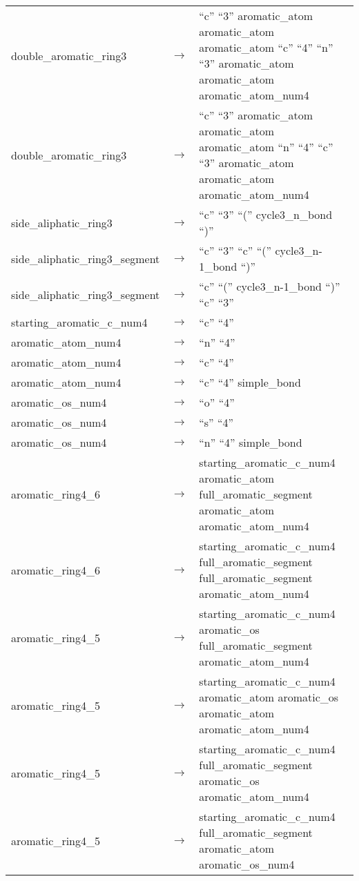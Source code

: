 \begin{longtable}{m{} p{} p{}}
    double\_aromatic\_ring3 & $\rightarrow$ & ``c'' ``3'' aromatic\_atom aromatic\_atom aromatic\_atom ``c'' ``4'' ``n'' ``3'' aromatic\_atom aromatic\_atom aromatic\_atom\_num4 \\
    double\_aromatic\_ring3 & $\rightarrow$ & ``c'' ``3'' aromatic\_atom aromatic\_atom aromatic\_atom ``n'' ``4'' ``c'' ``3'' aromatic\_atom aromatic\_atom aromatic\_atom\_num4 \\
    side\_aliphatic\_ring3 & $\rightarrow$ & ``c'' ``3'' ``('' cycle3\_n\_bond ``)'' \\
    side\_aliphatic\_ring3\_segment & $\rightarrow$ & ``c'' ``3'' ``c'' ``('' cycle3\_n-1\_bond ``)'' \\
    side\_aliphatic\_ring3\_segment & $\rightarrow$ & ``c'' ``('' cycle3\_n-1\_bond ``)'' ``c'' ``3'' \\
    starting\_aromatic\_c\_num4 & $\rightarrow$ & ``c'' ``4'' \\
    aromatic\_atom\_num4 & $\rightarrow$ & ``n'' ``4'' \\
    aromatic\_atom\_num4 & $\rightarrow$ & ``c'' ``4'' \\
    aromatic\_atom\_num4 & $\rightarrow$ & ``c'' ``4'' simple\_bond \\
    aromatic\_os\_num4 & $\rightarrow$ & ``o'' ``4'' \\
    aromatic\_os\_num4 & $\rightarrow$ & ``s'' ``4'' \\
    aromatic\_os\_num4 & $\rightarrow$ & ``n'' ``4'' simple\_bond \\
    aromatic\_ring4\_6 & $\rightarrow$ & starting\_aromatic\_c\_num4 aromatic\_atom full\_aromatic\_segment aromatic\_atom aromatic\_atom\_num4 \\
    aromatic\_ring4\_6 & $\rightarrow$ & starting\_aromatic\_c\_num4 full\_aromatic\_segment full\_aromatic\_segment aromatic\_atom\_num4 \\
    aromatic\_ring4\_5 & $\rightarrow$ & starting\_aromatic\_c\_num4 aromatic\_os full\_aromatic\_segment aromatic\_atom\_num4 \\
    aromatic\_ring4\_5 & $\rightarrow$ & starting\_aromatic\_c\_num4 aromatic\_atom aromatic\_os aromatic\_atom aromatic\_atom\_num4 \\
    aromatic\_ring4\_5 & $\rightarrow$ & starting\_aromatic\_c\_num4 full\_aromatic\_segment aromatic\_os aromatic\_atom\_num4 \\
    aromatic\_ring4\_5 & $\rightarrow$ & starting\_aromatic\_c\_num4 full\_aromatic\_segment aromatic\_atom aromatic\_os\_num4 \\

\end{longtable}
